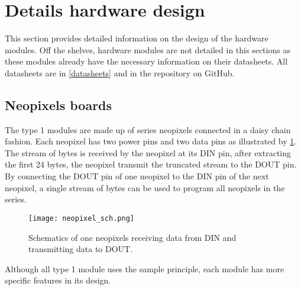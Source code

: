 \section{Details hardware design} \label{design}
This section provides detailed information on the design of the hardware modules. Off the shelves, hardware modules are not detailed in this sections as these modules already have the necessary information on their datasheets. All datasheets are in \ref{datasheets} and in the repository on GitHub. 

\subsection{Neopixels boards}
The type 1 modules are made up of series neopixels connected in a daisy chain fashion. Each neopixel has two power pins and two data pins as illustrated by \cref{fig:neopixel_sch}. The stream of bytes is received by the neopixel at its DIN pin, after extracting the first 24 bytes, the neopixel transmit the truncated stream to the DOUT pin. By connecting the DOUT pin of one neopixel to the DIN pin of the next neopixel, a single stream of bytes can be used to program all neopixels in the series. 
\begin{figure}[ht]
\centering
\texttt{[image: neopixel\_sch.png]}
\caption{Schematics of one neopixels receiving data from DIN and transmitting data to DOUT.}
\label{fig:neopixel_sch}
\end{figure}
Although all type 1 module uses the sample principle, each module has more specific features in its design.
